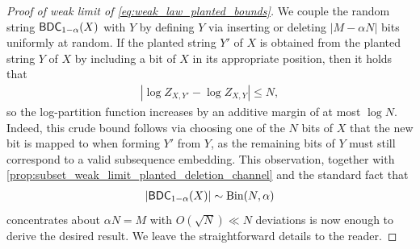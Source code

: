 \documentclass[11pt]{amsart}
\numberwithin{equation}{section}
\numberwithin{equation}{section}
\newcommand{\1}{\mathbbm{1}}
\newcommand{\Bin}{\textup{Bin}}
\newcommand{\BDC}{\textup{\textsf{BDC}}}
\theoremstyle{definition}
\begin{document}
\begin{proof}[Proof of weak limit of \eqref{eq:weak_law_planted_bounds}]
    We couple the random string $\BDC_{1-\alpha}(X)$ with $Y$ by defining $Y$ via inserting or deleting $|M - \alpha N|$ bits uniformly at random. If the planted string $Y'$ of $X$ is obtained from the planted string $Y$ of $X$ by including a bit of $X$ in its appropriate position, then it holds that
    \begin{align*}
        |\log Z_{X,Y'} - \log Z_{X,Y}| \leq N,
    \end{align*}
    so the log-partition function increases by an additive margin of at most $\log N$. Indeed, this crude bound follows via choosing one of the $N$ bits of $X$ that the new bit is mapped to when forming $Y'$ from $Y$, as the remaining bits of $Y$ must still correspond to a valid subsequence embedding. This observation, together with \cref{prop:subset_weak_limit_planted_deletion_channel} and the standard fact that 
    \begin{align*}
        |\BDC_{1-\alpha}(X)| \sim \Bin(N, \alpha)
    \end{align*}
    concentrates about $\alpha N = M$ with $O(\sqrt{N}) \ll N$ deviations is now enough to derive the desired result. We leave the straightforward details to the reader.
\end{proof}
\end{document}
